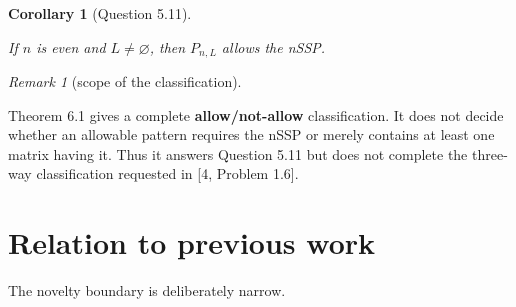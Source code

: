 \documentclass[11pt]{article}
\newtheorem{corollary}[theorem]{Corollary}
\theoremstyle{remark}
\newtheorem{remark}[theorem]{Remark}
\begin{document}
\begin{corollary}[Question 5.11]
\label{corollary:6-2}

If $n$ is even and $L\neq\varnothing$, then $P_{n,L}$ allows the nSSP.

\end{corollary}

\begin{remark}[scope of the classification]
\label{remark:6-3}

Theorem 6.1 gives a complete \textbf{allow/not-allow} classification. It does not decide whether an allowable
pattern requires the nSSP or merely contains at least one matrix having it. Thus it answers Question 5.11
but does not complete the three-way classification requested in [4, Problem 1.6].

\end{remark}

\section{Relation to previous work}


The novelty boundary is deliberately narrow.
\end{document}

